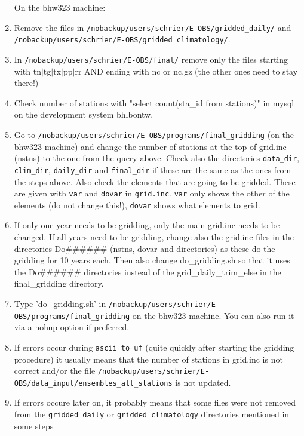 \documentclass[a4paper]{article}
\begin{document}
\begin{enumerate}
\noindent On the bhw323 machine:
\item Remove the files in
\texttt{/nobackup/users/schrier/E-OBS/gridded\_daily/}
and \linebreak
\texttt{/nobackup/users/schrier/E-OBS/gridded\_climatology/}.
\item In \texttt{/nobackup/users/schrier/E-OBS/final/} remove only the
  files starting with tn$|$tg$|$tx$|$pp$|$rr AND ending with nc or
  nc.gz (the other ones need to stay there!)
\item Check number of stations with "select count(sta\_id from
  stations)" in mysql on the development system bhlbontw.
\item Go to \texttt{/nobackup/users/schrier/E-OBS/programs/final\_gridding} (on the
  bhw323 machine) and change the number of stations at the top of
  grid.inc (nstns) to the one from the query above. Check also the
  directories \texttt{data\_dir}, \texttt{clim\_dir},
  \texttt{daily\_dir} and \texttt{final\_dir} if these are the same as
  the ones from the steps above. Also check the elements that are
  going to be gridded. These are given with \texttt{var} and
  \texttt{dovar} in \texttt{grid.inc}. \texttt{var} only shows the
  other of the elements (do not change this!), \texttt{dovar} shows
  what elements to grid.
\item If only one year needs to be gridding, only the main grid.inc
  needs to be changed. If all years need to be gridding, change also
  the grid.inc files in the directories Do\#\#\#\#\#\# (nstns, dovar
  and directories) as these do the gridding for 10 years each. Then
  also change do\_gridding.sh so that it uses the Do\#\#\#\#\#\#
  directories instead of the grid\_daily\_trim\_else in the
  final\_gridding directory.
\item Type 'do\_gridding.sh' in
  \texttt{/nobackup/users/schrier/E-OBS/programs/final\_gridding} on
  the bhw323 machine. You can also run it via a nohup option if
  preferred.
\item If errors occur during \texttt{ascii\_to\_uf} (quite quickly
  after starting the gridding procedure) it usually means that the
  number of stations in grid.inc is not correct and/or the file
  \texttt{/nobackup/users/schrier/E-OBS/data\_input/\linebreak ensembles\_all\_stations}
  is not updated.
\item If errors occure later on, it probably means that some files
  were not removed from the \texttt{gridded\_daily} or
  \texttt{gridded\_climatology} directories mentioned in some steps

\end{enumerate}
\end{document}
